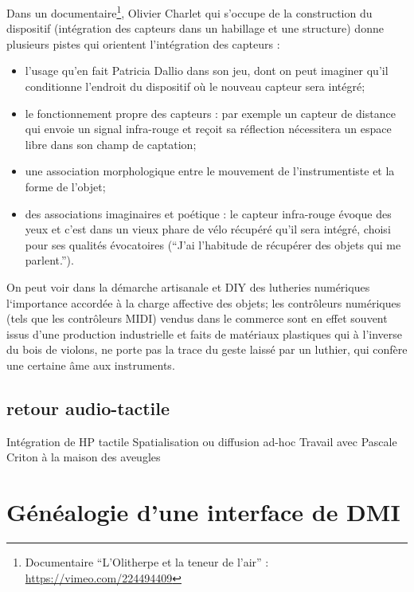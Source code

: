 Dans un documentaire\footnote{Documentaire ``L'Olitherpe et la teneur de l'air'' : \url{https://vimeo.com/224494409}}, Olivier Charlet qui s'occupe de la construction du dispositif (intégration des capteurs dans un habillage et une structure) donne plusieurs pistes qui orientent l'intégration des capteurs : 
\vspace{-1em}
\begin{itemize}[noitemsep]
\item l'usage qu'en fait Patricia Dallio dans son jeu, dont on peut imaginer qu'il conditionne l'endroit du dispositif où le nouveau capteur sera intégré; 
\item le fonctionnement propre des capteurs : par exemple un capteur de distance qui envoie un signal infra-rouge et reçoit sa réflection nécessitera un espace libre dans son champ de captation;
\item une association morphologique entre le mouvement de l'instrumentiste et la forme de l'objet;
\item des associations imaginaires et poétique : le capteur infra-rouge évoque des yeux et c'est dans un vieux phare de vélo récupéré qu'il sera intégré, choisi pour ses qualités évocatoires (``J'ai l'habitude de récupérer des objets qui me parlent.'').
\end{itemize}

On peut voir dans la démarche artisanale et \gls{DIY} des lutheries numériques l`importance accordée à la charge affective des objets; les contrôleurs numériques (tels que les contrôleurs MIDI) vendus dans le commerce sont en effet souvent issus d'une production industrielle et faits de matériaux plastiques qui à l'inverse du bois de violons, ne porte pas la trace du geste laissé par un luthier, qui confère une certaine âme aux instruments.

\subsection{retour audio-tactile}
Intégration de HP tactile
Spatialisation ou diffusion ad-hoc
Travail avec Pascale Criton à la maison des aveugles


\section{Généalogie d’une interface de DMI}
\label{sec:interfaces:sec1}

